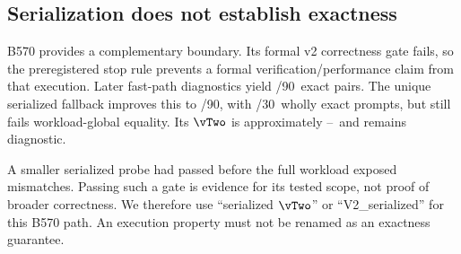 \subsection{Serialization does not establish exactness}
B570 provides a complementary boundary. Its formal v2 correctness gate fails, so the preregistered stop rule prevents a formal verification/performance claim from that execution. Later fast-path diagnostics yield \BFastExact/90\ exact pairs. The unique serialized fallback improves this to \BExact/90, with \BExactPrompts/30\ wholly exact prompts, but still fails workload-global equality. Its $\vTwo$ is approximately \BvShort--\BvLong\ and remains diagnostic.

A smaller serialized probe had passed before the full workload exposed mismatches. Passing such a gate is evidence for its tested scope, not proof of broader correctness. We therefore use ``serialized $\vTwo$'' or ``V2\_serialized'' for this B570 path. An execution property must not be renamed as an exactness guarantee.
